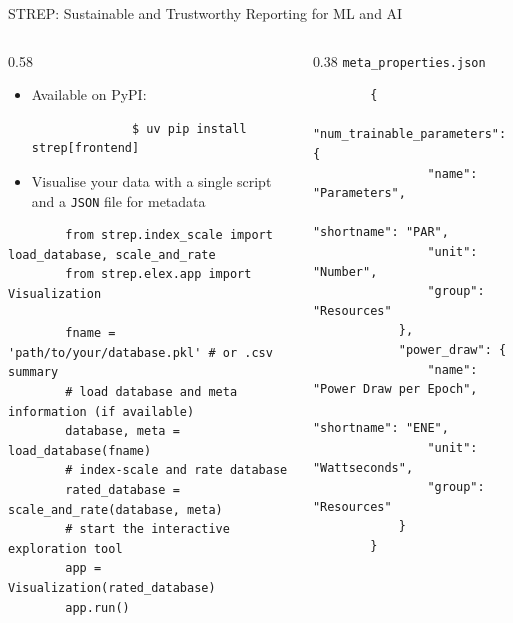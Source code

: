 \begin{darkframe}[fragile]{STREP: Sustainable and Trustworthy Reporting for ML and AI}
  \begin{columns}[t]
    \begin{column}{0.58\textwidth}
      \begin{itemize}
        \setlength{\itemsep}{1em}
        \item Available on PyPI:
          \begin{verbatim}
              $ uv pip install strep[frontend]
          \end{verbatim}
        \item Visualise your data with a single script and a \texttt{JSON} file for metadata
      \end{itemize}
      \vspace{3em}
      \begin{verbatim}
        from strep.index_scale import load_database, scale_and_rate
        from strep.elex.app import Visualization

        fname = 'path/to/your/database.pkl' # or .csv summary
        # load database and meta information (if available)
        database, meta = load_database(fname)
        # index-scale and rate database
        rated_database = scale_and_rate(database, meta)
        # start the interactive exploration tool
        app = Visualization(rated_database)
        app.run()
      \end{verbatim}
    \end{column}
    \hfill
    \begin{column}{0.38\textwidth}
      \texttt{meta\_properties.json}
      \begin{verbatim}
        {
            "num_trainable_parameters": {
                "name": "Parameters",
                "shortname": "PAR",
                "unit": "Number",
                "group": "Resources"
            },
            "power_draw": {
                "name": "Power Draw per Epoch",
                "shortname": "ENE",
                "unit": "Wattseconds",
                "group": "Resources"
            }
        }
      \end{verbatim}
    \end{column}
  \end{columns}
\end{darkframe}


